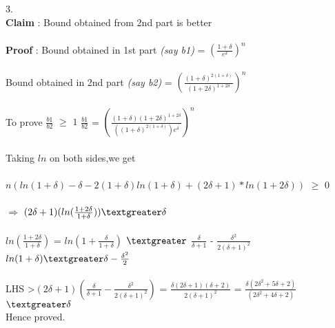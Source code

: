 \documentclass{article}
\begin{document}
3. \\
\textbf{Claim} : Bound obtained from 2nd part is better \\\\ 
\textbf{Proof} : Bound obtained in 1st part \textit{(say b1)} = $(\frac{1+\delta}{e^{\delta}})^{n}$ \\\\ 
Bound obtained in 2nd part \textit{(say b2)} = $(\frac{(1+\delta)^{2(1+\delta)}}{(1+2\delta)^{1+2\delta}})^{n}$ \\\\
To prove $\frac{b1}{b2}$ $\geq$ $1$
$\frac{b1}{b2}$ = $(\frac{(1+\delta)(1+2\delta)^{1+2\delta}}{((1+\delta)^{2(1+\delta)})e^{\delta}})^{n}$ \\\\
Taking $ln$ on both sides,we get \\\\
$n(ln(1+\delta) - \delta - 2(1+\delta)ln(1+\delta) + (2\delta + 1)*ln(1+2\delta))$ $\geq$ 0 \\\\
$\Longrightarrow$ 
$(2\delta + 1)(ln(\frac{1 + 2\delta}{1 + \delta})) \textgreater \delta$ \\\\
$ln(\frac{1 + 2\delta}{1 + \delta})$ = $ln(1+\frac{\delta}{1+\delta})$ $\textgreater$ $\frac{\delta}{\delta + 1}$ - $\frac{\delta^{2}}{2(\delta + 1)^{2}}$ \hfill{$ln(1 + \delta) \textgreater \delta - \frac{\delta^{2}}{2}$  } \\\\
LHS \textgreater $(2\delta + 1)(\frac{\delta}{\delta + 1} - \frac{\delta^{2}}{2(\delta + 1)^{2}})$
= $\frac{\delta(2\delta + 1)(\delta + 2)}{2(\delta + 1)^{2}}$
= $\frac{\delta(2\delta^{2} + 5\delta + 2)}{(2\delta^{2} + 4\delta + 2)}$
$\textgreater \delta $ \\
Hence proved. \\\\
\end{document}
